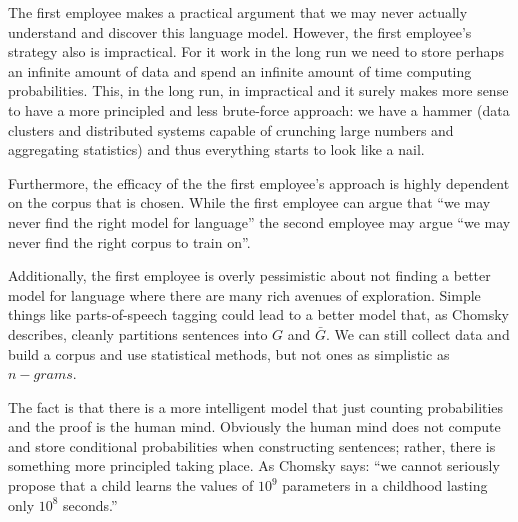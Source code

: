 \documentclass[11pt]{article}
\begin{document}
The first employee makes a practical argument that we may never actually understand and discover this language model. However, the first employee's strategy also is impractical. For it work in the long run we need to store perhaps an infinite amount of data and spend an infinite amount of time computing probabilities. This, in the long run, in impractical and it surely makes more sense to have a more principled and less brute-force approach: we have a hammer (data clusters and distributed systems capable of crunching large numbers and aggregating statistics) and thus everything starts to look like a nail.

Furthermore, the efficacy of the the first employee's approach is highly dependent on the corpus that is chosen. While the first employee can argue that ``we may never find the right model for language'' the second employee may argue ``we may never find the right corpus to train on''.

Additionally, the first employee is overly pessimistic about not finding a better model for language where there are many rich avenues of exploration. Simple things like parts-of-speech tagging could lead to a better model that, as Chomsky describes, cleanly partitions sentences into $G$ and $\bar{G}$. We can still collect data and build a corpus and use statistical methods, but not ones as simplistic as $n-grams$. 

The fact is that there is a more intelligent model that just counting probabilities and the proof is the human mind. Obviously the human mind does not compute and store conditional probabilities when constructing sentences; rather, there is something more principled taking place. As Chomsky says: ``we cannot seriously propose that a child learns the values of $10^9$ parameters in a childhood lasting only $10^8$ seconds.''
\end{document}

